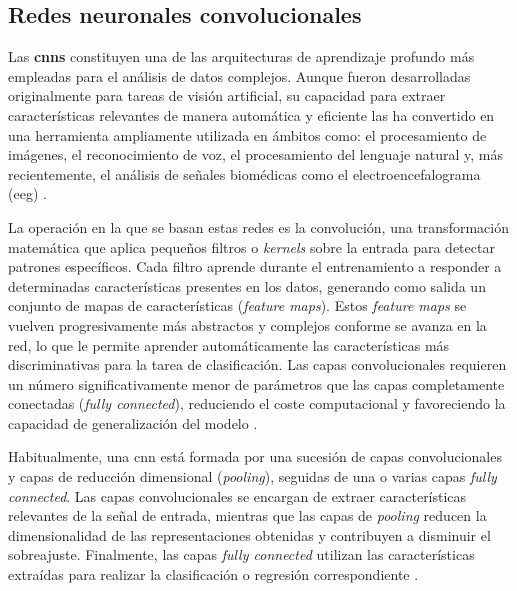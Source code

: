 \subsection{Redes neuronales convolucionales}

Las \textbf{\acrfull{cnns}} constituyen una de las arquitecturas de aprendizaje profundo más empleadas para el análisis de datos complejos. Aunque fueron desarrolladas originalmente para tareas de visión artificial, su capacidad para extraer características relevantes de manera automática y eficiente las ha convertido en una herramienta ampliamente utilizada en ámbitos como: el procesamiento de imágenes, el reconocimiento de voz, el procesamiento del lenguaje natural y, más recientemente, el análisis de señales biomédicas como el electroencefalograma (\acrshort{eeg}) \cite{albawi_UnderstandingConvolutional2017,lecun_DeepLearning2015,edelman_NonInvasiveBrainComputer2025,schmidhuber_DeepLearning2015}.

La operación en la que se basan estas redes es la convolución, una transformación matemática que aplica pequeños filtros o \textit{kernels} sobre la entrada para detectar patrones específicos. Cada filtro aprende durante el entrenamiento a responder a determinadas características presentes en los datos, generando como salida un conjunto de mapas de características (\textit{feature maps}). Estos \textit{feature maps} se vuelven progresivamente más abstractos y complejos conforme se avanza en la red, lo que le permite aprender automáticamente las características más discriminativas para la tarea de clasificación. Las capas convolucionales requieren un número significativamente menor de parámetros que las capas completamente conectadas (\textit{fully connected}), reduciendo el coste computacional y favoreciendo la capacidad de generalización del modelo \cite{albawi_UnderstandingConvolutional2017,edelman_NonInvasiveBrainComputer2025,lecun_DeepLearning2015,goodfellow_DeepLearning2016}.

Habitualmente, una \acrshort{cnn} está formada por una sucesión de capas convolucionales y capas de reducción dimensional (\textit{pooling}), seguidas de una o varias capas \textit{fully connected}. Las capas convolucionales se encargan de extraer características relevantes de la señal de entrada, mientras que las capas de \textit{pooling} reducen la dimensionalidad de las representaciones obtenidas y contribuyen a disminuir el sobreajuste. Finalmente, las capas \textit{fully connected} utilizan las características extraídas para realizar la clasificación o regresión correspondiente \cite{albawi_UnderstandingConvolutional2017,rakhmatulin_ExploringConvolutional2024}.

